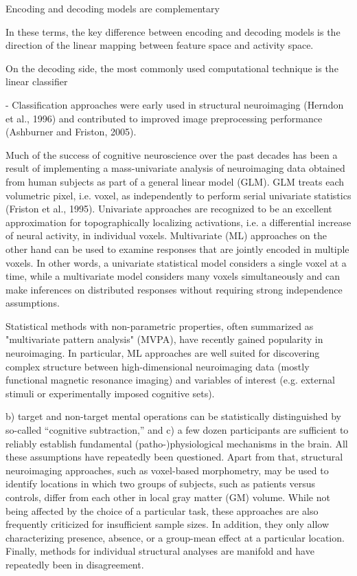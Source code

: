 \documentclass[authoryear,review,3p]{elsarticle}
\begin{document}
Encoding and decoding models are complementary

In these terms, the key difference between encoding and decoding models is the direction of the linear mapping between feature space and activity space. 


On the decoding side, the most commonly used computational technique is the linear classifier






- Classification approaches were early used in structural neuroimaging (Herndon et al., 1996) and contributed to improved image preprocessing performance (Ashburner and Friston, 2005).















Much of the success of cognitive neuroscience over the past decades has been a result of implementing a mass-univariate analysis of neuroimaging data obtained from human subjects as part of a general linear model (GLM). GLM treats each volumetric pixel, i.e. voxel, as independently to perform serial univariate statistics (Friston et al., 1995). 
Univariate approaches are recognized to be an excellent approximation for topographically localizing activations, i.e. a differential increase of neural activity, in individual voxels. Multivariate (ML) approaches on the other hand can be used to examine responses that are jointly encoded in multiple voxels. In other words, a univariate statistical model considers a single voxel at a time, while a multivariate model considers many voxels simultaneously and can make inferences on distributed responses without requiring strong independence assumptions. 

Statistical methods with non-parametric properties, often summarized as "multivariate pattern analysis" (MVPA), have recently gained popularity in neuroimaging. In particular, ML approaches are well suited for discovering complex structure between high-dimensional neuroimaging data (mostly functional magnetic resonance imaging) and variables of interest (e.g. external stimuli or experimentally imposed cognitive sets). 


b) target and non-target mental operations can be statistically distinguished by so-called “cognitive subtraction,” and c) a few dozen participants are sufficient to reliably establish fundamental (patho-)physiological mechanisms in the brain. All these assumptions have repeatedly been questioned. Apart from that, structural neuroimaging approaches, such as voxel-based morphometry, may be used to identify locations in which two groups of subjects, such as patients versus controls, differ from each other in local gray matter (GM) volume. While not being affected by the choice of a particular task, these approaches are also frequently criticized for insufficient sample sizes. In addition, they only allow characterizing presence, absence, or a group-mean effect at a particular location. Finally, methods for individual structural analyses are manifold and have repeatedly been in disagreement.
\end{document}

